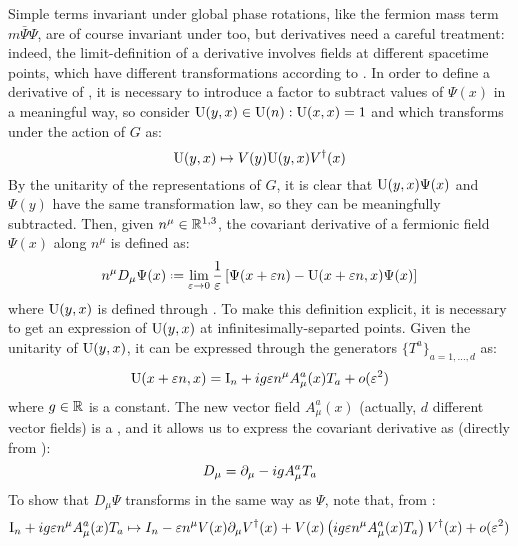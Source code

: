 Simple terms invariant under global phase rotations, like the fermion mass term $ m \bar{\Psi} \Psi $, are of course invariant under  too, but derivatives need a careful treatment: indeed, the limit-definition of a derivative involves fields at different spacetime points, which have different transformations according to . In order to define a derivative of \Psi, it is necessary to introduce a factor to subtract values of $ \Psi(x) $ in a meaningful way, so consider $ \mathrm{U}(y,x) \in \mathrm{U}(n) : \mathrm{U}(x,x) = 1 $ and which transforms under the action of $ G $ as:
\begin{equation}
  \mathrm{U}(y,x) \mapsto V(y) \mathrm{U}(y,x) V^\dagger(x)
  \label{eq:fac-cov-der}
\end{equation}
By the unitarity of the representations of $ G $, it is clear that $ \mathrm{U}(y,x) \Psi(x) $ and $ \Psi(y) $ have the same transformation law, so they can be meaningfully subtracted. Then, given $ n^\mu \in \mathbb{R}^{1,3} $, the covariant derivative of a fermionic field $ \Psi(x) $ along $ n^\mu $ is defined as:
\begin{equation}
  n^\mu D_\mu \Psi(x) \defeq \lim_{\varepsilon \rightarrow 0} \frac{1}{\varepsilon} \left[ \Psi(x + \varepsilon n) - \mt{U}(x + \varepsilon n, x) \Psi(x) \right]
  \label{eq:cov-der-def}
\end{equation}
where $ \mathrm{U}(y,x) $ is defined through . To make this definition explicit, it is necessary to get an expression of $ \mathrm{U}(y,x) $ at infinitesimally-separted points. Given the unitarity of $ \mathrm{U}(y,x) $, it can be expressed through the generators $ \{T^a\}_{a = 1, \dots, d} $ as:
\begin{equation}
  \mathrm{U}(x + \varepsilon n, x) = \mathrm{I}_n + i g \varepsilon n^\mu A_\mu^a(x) T_a + o(\varepsilon^2)
  \label{eq:fac-cov-der-exp}
\end{equation}
where $ g \in \mathbb{R} $ is a constant. The new vector field $ A_\mu^a(x) $ (actually, $ d $ different vector fields) is a , and it allows us to express the covariant derivative as (directly from ):
\begin{equation}
  D_\mu = \partial_\mu - i g A_\mu^a T_a
\end{equation}
To show that $ D_\mu \Psi $ transforms in the same way as $ \Psi $, note that, from :
\begin{equation*}
  \mathrm{I}_n + i g \varepsilon n^\mu A_\mu^a(x) T_a \mapsto I_n - \varepsilon n^\mu V(x) \partial_\mu V^\dagger(x) + V(x) \left( i g \varepsilon n^\mu A_\mu^a(x) T_a \right) V^\dagger(x) + o(\varepsilon^2)
\end{equation*}
